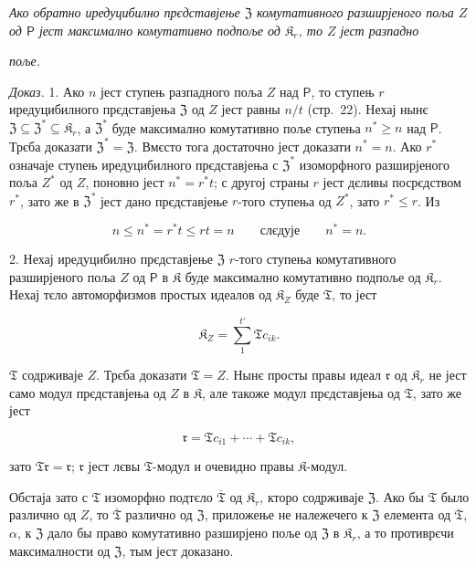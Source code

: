 \documentclass[11pt]{article}
\begin{document}
\emph{Ако обратно иредуцибилно прєдставјење \(\mathfrak Z\) комутативного разширјеного поља \(Z\) од \(\mathsf P\) јест максимално комутативно подпоље од \(\mathfrak K_r\), то \(Z\) јест разпадно}

\emph{поље.}

\emph{Доказ.} 1. Ако \(n\) јест ступењ разпадного поља \(Z\) над \(\mathsf P\), то ступењ \(r\) иредуцибилного прєдставјења \(\mathfrak Z\) од \(Z\) јест равны \(n/t\) (стр.~22). Нехај нынє \(\mathfrak Z\subseteq\mathfrak Z^*\subseteq\mathfrak K_r\), а \(\mathfrak Z^*\) буде максимално комутативно поље ступења \(n^*\geq n\) над \(\mathsf P\). Трєба доказати \(\mathfrak Z^*=\mathfrak Z\). Вмєсто тога достаточно јест доказати \(n^*=n\). Ако \(r^*\) означаје ступењ иредуцибилного прєдставјења с \(\mathfrak Z^*\) изоморфного разширјеного поља \(Z^*\) од \(Z\), поновно јест \(n^*=r^*t\); с другој страны \(r\) јест дєливы посрєдством \(r^*\), зато же в \(\mathfrak Z^*\) јест дано прєдставјење \(r\)-того ступења од \(Z^*\), зато \(r^*\leq r\). Из

\[
n\leq n^*=r^*t\leq rt=n \qquad\text{слєдује}\qquad n^*=n.
\]

2. Нехај иредуцибилно прєдставјење \(\mathfrak Z\) \(r\)-того ступења комутативного разширјеного поља \(Z\) од \(\mathsf P\) в \(\mathfrak K\) буде максимално комутативно подпоље од \(\mathfrak K_r\). Нехај тєло автоморфизмов простых идеалов од \(\mathfrak K_Z\) буде \(\mathfrak T\), то јест

\[
\mathfrak K_Z=\sum_{1}^{t'}\mathfrak T c_{ik}.
\]

\(\mathfrak T\) содрживаје \(Z\). Трєба доказати \(\mathfrak T=Z\). Нынє просты правы идеал \(\mathfrak r\) од \(\mathfrak K_r\) не јест само модул прєдставјења од \(Z\) в \(\mathfrak K\), але такоже модул прєдставјења од \(\mathfrak T\), зато же јест

\[
\mathfrak r=\mathfrak T c_{i1}+\cdots+\mathfrak T c_{ik},
\]

зато \(\mathfrak T\mathfrak r=\mathfrak r\); \(\mathfrak r\) јест лєвы \(\mathfrak T\)-модул и очевидно правы \(\mathfrak K\)-модул.

Обстаја зато с \(\mathfrak T\) изоморфно подтєло \(\overline{\mathfrak T}\) од \(\mathfrak K_r\), кторо содрживаје \(\mathfrak Z\). Ако бы \(\mathfrak T\) было различно од \(Z\), то \(\overline{\mathfrak T}\) различно од \(\mathfrak Z\), приложење не належечего к \(\mathfrak Z\) елемента од \(\overline{\mathfrak T}\), \(\alpha\), к \(\mathfrak Z\) дало бы право комутативно разширјено поље од \(\mathfrak Z\) в \(\mathfrak K_r\), а то противрєчи максималности од \(\mathfrak Z\), тым јест доказано.
\end{document}

